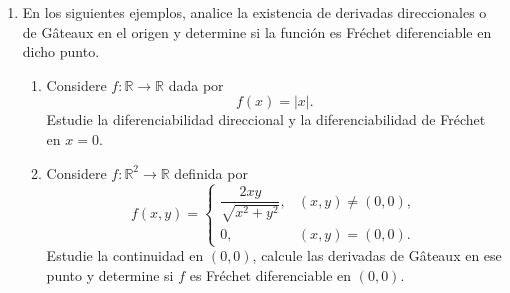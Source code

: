 \documentclass[11pt]{article}
\theoremstyle{thmstyle}
\def\R{\mathbb R}
\begin{document}
\begin{enumerate}[label=\textbf{\arabic*.}, leftmargin=*]
    \item En los siguientes ejemplos, analice la existencia de derivadas direccionales o de Gâteaux en el origen y determine si la función es Fréchet diferenciable en dicho punto.
    \begin{enumerate}[label=(\alph*)]
        \item Considere $f:\R\to\R$ dada por
        \[
        f(x)=|x|.
        \]
        Estudie la diferenciabilidad direccional y la diferenciabilidad de Fréchet en $x=0$.
        \item Considere $f:\R^2\to\R$ definida por
        \[
        f(x,y)=
        \begin{cases}
        \dfrac{2xy}{\sqrt{x^2+y^2}}, & (x,y)\neq(0,0),\\[1ex]
        0, & (x,y)=(0,0).
        \end{cases}
        \]
        Estudie la continuidad en $(0,0)$, calcule las derivadas de Gâteaux en ese punto y determine si $f$ es Fréchet diferenciable en $(0,0)$.
    \end{enumerate}

\end{enumerate}
\end{document}
